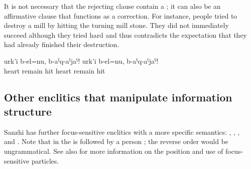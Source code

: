 It is not necessary that the rejecting clause contain a ; it can also be an affirmative clause that functions as a correction. For instance, people tried to destroy a mill by hitting the turning mill stone. They did not immediately succeed although they tried hard and thus  contradicts the expectation that they had already finished their destruction.

\begin{exe}
	\ex	\label{ex:The heart remained, hit it! The heart remained, hit it minor}
	\gll	urk'i	b-el=nu,	b-aˁq-aˁjaˁ!	urk'i	b-el=nu,	b-aˁq-aˁjaˁ!\\
		heart	remain	hit	heart	\tsc{n-}remain hit\\
	\glt	{}
\end{exe}



\subsection{Other enclitics that manipulate information structure}
\label{ssec:Further enclitics that manipulate the information structure}

Sanzhi has further focus-sensitive enclitics with a more specific semantics:   ,   ,   , and   . Note that in  the   is followed by a person ; the reverse order would be ungrammatical. See also  for more information on the position and use of focus-sensitive particles.

